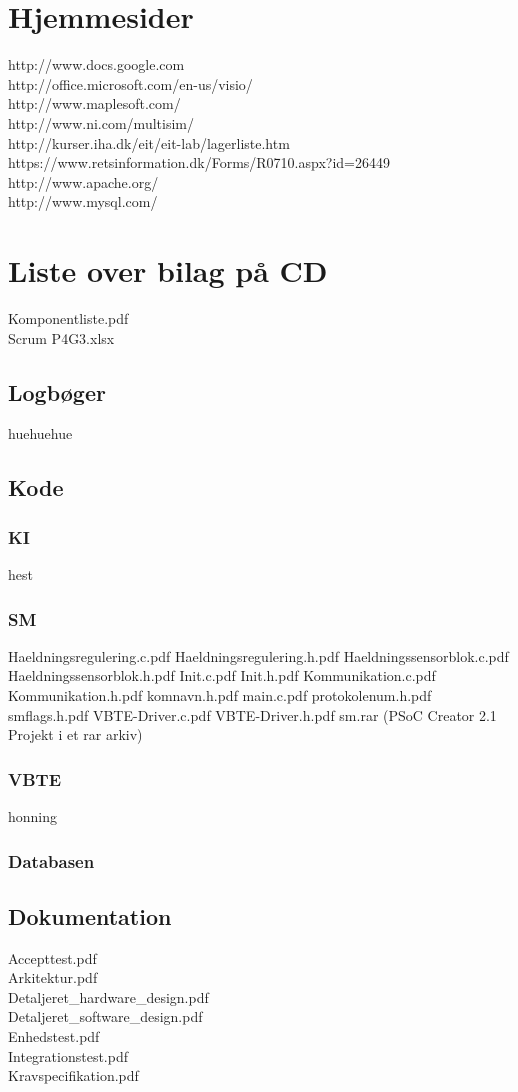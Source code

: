 \section{Hjemmesider}
http://www.docs.google.com\\
http://office.microsoft.com/en-us/visio/\\
http://www.maplesoft.com/\\
http://www.ni.com/multisim/\\
http://kurser.iha.dk/eit/eit-lab/lagerliste.htm\\
https://www.retsinformation.dk/Forms/R0710.aspx?id=26449\\
http://www.apache.org/\\
http://www.mysql.com/\\

\section{Liste over bilag på CD}
Komponentliste.pdf\\
Scrum P4G3.xlsx\\
\subsection{Logbøger}
huehuehue
\subsection{Kode}
\subsubsection{KI}
hest
\subsubsection{SM}
Haeldningsregulering.c.pdf
Haeldningsregulering.h.pdf
Haeldningssensorblok.c.pdf
Haeldningssensorblok.h.pdf
Init.c.pdf
Init.h.pdf
Kommunikation.c.pdf
Kommunikation.h.pdf
komnavn.h.pdf
main.c.pdf
protokolenum.h.pdf
smflags.h.pdf
VBTE-Driver.c.pdf
VBTE-Driver.h.pdf
sm.rar (PSoC Creator 2.1 Projekt i et rar arkiv)
\subsubsection{VBTE}
honning
\subsubsection{Databasen}
\subsection{Dokumentation}
Accepttest.pdf\\
Arkitektur.pdf\\
Detaljeret\_hardware\_design.pdf\\
Detaljeret\_software\_design.pdf\\
Enhedstest.pdf\\
Integrationstest.pdf\\
Kravspecifikation.pdf\\

